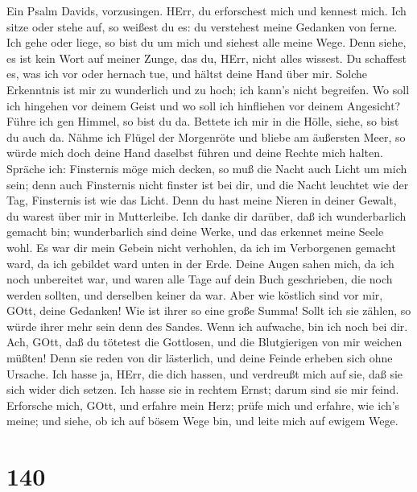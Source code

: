  Ein Psalm Davids, vorzusingen. HErr, du erforschest mich
und kennest mich.  Ich sitze oder stehe auf, so weißest du
es: du verstehest meine Gedanken von ferne.  Ich gehe oder
liege, so bist du um mich und siehest alle meine Wege.  Denn
siehe, es ist kein Wort auf meiner Zunge, das du, HErr, nicht alles
wissest.  Du schaffest es, was ich vor oder hernach tue, und
hältst deine Hand über mir.  Solche Erkenntnis ist mir zu
wunderlich und zu hoch; ich kann's nicht begreifen.  Wo soll
ich hingehen vor deinem Geist und wo soll ich hinfliehen vor deinem
Angesicht?  Führe ich gen Himmel, so bist du da. Bettete ich
mir in die Hölle, siehe, so bist du auch da.  Nähme ich
Flügel der Morgenröte und bliebe am äußersten Meer,  so
würde mich doch deine Hand daselbst führen und deine Rechte mich halten.
 Spräche ich: Finsternis möge mich decken, so muß die Nacht
auch Licht um mich sein;  denn auch Finsternis nicht
finster ist bei dir, und die Nacht leuchtet wie der Tag, Finsternis ist
wie das Licht.  Denn du hast meine Nieren in deiner Gewalt,
du warest über mir in Mutterleibe.  Ich danke dir darüber,
daß ich wunderbarlich gemacht bin; wunderbarlich sind deine Werke, und
das erkennet meine Seele wohl.  Es war dir mein Gebein
nicht verhohlen, da ich im Verborgenen gemacht ward, da ich gebildet
ward unten in der Erde.  Deine Augen sahen mich, da ich
noch unbereitet war, und waren alle Tage auf dein Buch geschrieben, die
noch werden sollten, und derselben keiner da war.  Aber wie
köstlich sind vor mir, GOtt, deine Gedanken! Wie ist ihrer so eine große
Summa!  Sollt ich sie zählen, so würde ihrer mehr sein denn
des Sandes. Wenn ich aufwache, bin ich noch bei dir.  Ach,
GOtt, daß du tötetest die Gottlosen, und die Blutgierigen von mir
weichen müßten!  Denn sie reden von dir lästerlich, und
deine Feinde erheben sich ohne Ursache.  Ich hasse ja,
HErr, die dich hassen, und verdreußt mich auf sie, daß sie sich wider
dich setzen.  Ich hasse sie in rechtem Ernst; darum sind
sie mir feind.  Erforsche mich, GOtt, und erfahre mein
Herz; prüfe mich und erfahre, wie ich's meine;  und siehe,
ob ich auf bösem Wege bin, und leite mich auf ewigem Wege.

\hypertarget{section-139}{%
\section{140}\label{section-139}}


